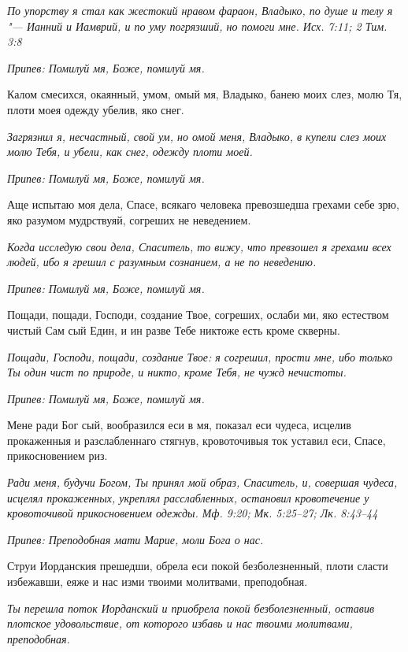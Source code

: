 \itshape По упорству я стал как жестокий нравом фараон, Владыко, по душе и телу я "--- Ианний и Иамврий, и по уму погрязший, но помоги мне. Исх. 7:11; 2 Тим. 3:8\normalfont{}


\itshape Припев:\normalfont{} Помилуй мя, Боже, помилуй мя.


Калом смесихся, окаянный, умом, омый мя, Владыко, банею моих слез, молю Тя, плоти моея одежду убелив, яко снег.


\itshape Загрязнил я, несчастный, свой ум, но омой меня, Владыко, в купели слез моих молю Тебя, и убели, как снег, одежду плоти моей.\normalfont{}


\itshape Припев:\normalfont{} Помилуй мя, Боже, помилуй мя.


Аще испытаю моя дела, Спасе, всякаго человека превозшедша грехами себе зрю, яко разумом мудрствуяй, согреших не неведением.


\itshape Когда исследую свои дела, Спаситель, то вижу, что превзошел я грехами всех людей, ибо я грешил с разумным сознанием, а не по неведению.\normalfont{}


\itshape Припев:\normalfont{} Помилуй мя, Боже, помилуй мя.


Пощади, пощади, Господи, создание Твое, согреших, ослаби ми, яко естеством чистый Сам сый Един, и ин разве Тебе никтоже есть кроме скверны.


\itshape Пощади, Господи, пощади, создание Твое: я согрешил, прости мне, ибо только Ты один чист по природе, и никто, кроме Тебя, не чужд нечистоты.\normalfont{}


\itshape Припев:\normalfont{} Помилуй мя, Боже, помилуй мя.


Мене ради Бог сый, вообразился еси в мя, показал еси чудеса, исцелив прокаженныя и разслабленнаго стягнув, кровоточивыя ток уставил еси, Спасе, прикосновением риз.


\itshape Ради меня, будучи Богом, Ты принял мой образ, Спаситель, и, совершая чудеса, исцелял прокаженных, укреплял расслабленных, остановил кровотечение у кровоточивой прикосновением одежды. Мф. 9:20; Мк. 5:25–27; Лк. 8:43–44\normalfont{}


\itshape Припев:\normalfont{} Преподобная мати Марие, моли Бога о нас.


Струи Иорданския прешедши, обрела еси покой безболезненный, плоти сласти избежавши, еяже и нас изми твоими молитвами, преподобная.


\itshape Ты перешла поток Иорданский и приобрела покой безболезненный, оставив плотское удовольствие, от которого избавь и нас твоими молитвами, преподобная.\normalfont{}



